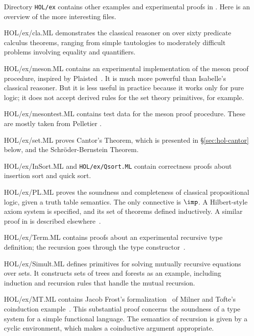 Directory {\tt HOL/ex} contains other examples and experimental proofs in
{\HOL}.  Here is an overview of the more interesting files.
\begin{ttdescription}
\item[HOL/ex/cla.ML] demonstrates the classical reasoner on over sixty
  predicate calculus theorems, ranging from simple tautologies to
  moderately difficult problems involving equality and quantifiers.

\item[HOL/ex/meson.ML] contains an experimental implementation of the {\sc
    meson} proof procedure, inspired by Plaisted~\cite{plaisted90}.  It is
  much more powerful than Isabelle's classical reasoner.  But it is less
  useful in practice because it works only for pure logic; it does not
  accept derived rules for the set theory primitives, for example.

\item[HOL/ex/mesontest.ML] contains test data for the {\sc meson} proof
  procedure.  These are mostly taken from Pelletier \cite{pelletier86}.

\item[HOL/ex/set.ML] proves Cantor's Theorem, which is presented in
  \S\ref{sec:hol-cantor} below, and the Schr\"oder-Bernstein Theorem.

\item[HOL/ex/InSort.ML] and {\tt HOL/ex/Qsort.ML} contain correctness
  proofs about insertion sort and quick sort.

\item[HOL/ex/PL.ML] proves the soundness and completeness of classical
  propositional logic, given a truth table semantics.  The only connective
  is $\imp$.  A Hilbert-style axiom system is specified, and its set of
  theorems defined inductively.  A similar proof in \ZF{} is described
  elsewhere~\cite{paulson-set-II}. 

\item[HOL/ex/Term.ML] 
  contains proofs about an experimental recursive type definition;
  the recursion goes through the type constructor~.

\item[HOL/ex/Simult.ML] defines primitives for solving mutually recursive
  equations over sets.  It constructs sets of trees and forests as an
  example, including induction and recursion rules that handle the mutual
  recursion.

\item[HOL/ex/MT.ML] contains Jacob Frost's formalization~\cite{frost93} of
  Milner and Tofte's coinduction example~\cite{milner-coind}.  This
  substantial proof concerns the soundness of a type system for a simple
  functional language.  The semantics of recursion is given by a cyclic
  environment, which makes a coinductive argument appropriate.
\end{ttdescription}


